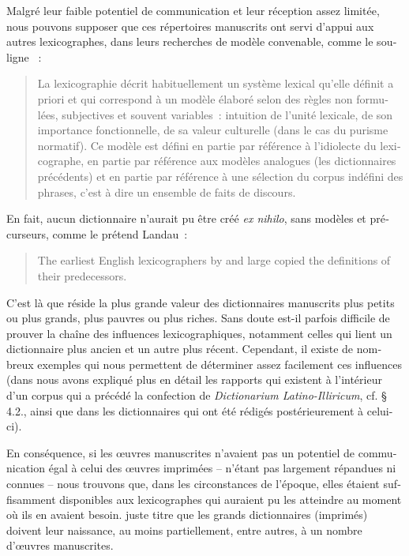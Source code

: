 \documentclass[output=paper,colorlinks,citecolor=brown,arabicfont,chinesefont,booklanguage=french]{langscibook}
\begin{document}
\begin{otherlanguage}{french}
Malgré leur faible potentiel de communication et leur réception assez limitée, nous pouvons supposer que ces répertoires manuscrits ont servi d’appui aux autres lexicographes, dans leurs recherches de modèle convenable, comme le souligne \citet[118]{Rey2008}~: 

\begin{quote}
    La lexicographie décrit habituellement un système lexical qu’elle définit a priori et qui correspond à un modèle élaboré selon des règles non formulées, subjectives et souvent variables~: intuition de l’unité lexicale, de son importance fonctionnelle, de sa valeur culturelle (dans le cas du purisme normatif). Ce modèle est défini en partie par référence à l’idiolecte du lexicographe, en partie par référence aux modèles analogues (les dictionnaires précédents) et en partie par référence à une sélection du corpus indéfini des phrases, c’est à dire un ensemble de faits de discours.
\end{quote}

En fait, aucun dictionnaire n’aurait pu être créé \emph{ex nihilo}, sans modèles et précurseurs, comme le prétend Landau~: 

\begin{quote}
The earliest English lexicographers by and large copied the definitions of their predecessors. \citep[190]{Landau2001}    
\end{quote}

C’est là que réside la plus grande valeur des dictionnaires manuscrits plus petits ou plus grands, plus pauvres ou plus riches. Sans doute est-il parfois difficile de prouver la chaîne des influences lexicographiques, notamment celles qui lient un dictionnaire plus ancien et un autre plus récent. Cependant, il existe de nombreux exemples qui nous permettent de déterminer assez facilement ces influences (dans \citet{Franic2014} nous avons expliqué plus en détail les rapports qui existent à l’intérieur d’un corpus qui a précédé la confection de \emph{Dictionarium Latino-Illiricum}, cf. § 4.2., ainsi que dans les dictionnaires qui ont été rédigés postérieurement à celui-ci).

En conséquence, si les œuvres manuscrites n’avaient pas un potentiel de communication égal à celui des œuvres imprimées – n’étant pas largement répandues ni connues – nous trouvons que, dans les circonstances de l’époque, elles étaient suffisamment disponibles aux lexicographes qui auraient pu les atteindre au moment où ils en avaient besoin. juste titre que les grands dictionnaires (imprimés) doivent leur naissance, au moins partiellement, entre autres, à un nombre d’œuvres manuscrites.


\end{otherlanguage}
\end{document}
